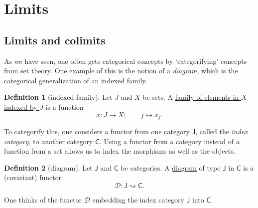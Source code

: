 \documentclass[a4paper]{report}
\newcommand{\defn}[1]{\ul{#1}}
\theoremstyle{definition}
\newtheorem{definition}{Definition}[section]
\theoremstyle{plain}
\theoremstyle{remark}
\begin{document}
\section{Limits} \label{sec:limits}
\subsection{Limits and colimits}
As we have seen, one often gets categorical concepts by `categorifying' concepts from set theory. One example of this is the notion of a \emph{diagram}, which is the categorical generalization of an indexed family.

\begin{definition}[indexed family]
  \label{def:indexedfamily}
  Let $J$ and $X$ be sets. A \defn{family of elements in $X$ indexed by $J$} is a function
  \begin{equation*}
    x\colon J \to X;\qquad j \mapsto x_{j}.
  \end{equation*}
\end{definition}

To categorify this, one considers a functor from one category $\mathsf{J}$, called the \emph{index category}, to another category $\mathsf{C}$. Using a functor from a category instead of a function from a set allows us to index the morphisms as well as the objects. 

\begin{definition}[diagram]
  \label{def:diagram}
  Let $\mathsf{J}$ and $\mathsf{C}$ be categories. A \defn{diagram} of type $\mathsf{J}$ in $\mathsf{C}$ is a (covariant) functor
  \begin{equation*}
    \mathcal{D}\colon \mathsf{J} \rightsquigarrow \mathsf{C}.
  \end{equation*}
\end{definition}

One thinks of the functor $\mathcal{D}$ embedding the index category $\textsf{J}$ into $\mathsf{C}$.
\end{document}
